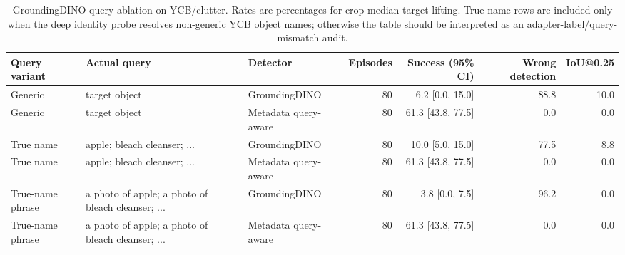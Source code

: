 \begin{table}[t]
\centering
\caption{GroundingDINO query-ablation on YCB/clutter. Rates are percentages for crop-median target lifting. True-name rows are included only when the deep identity probe resolves non-generic YCB object names; otherwise the table should be interpreted as an adapter-label/query-mismatch audit.}
\label{tab:scirep-query-ablation}
\scriptsize
\begin{tabular}{lllrrrr}
\toprule
Query variant & Actual query & Detector & Episodes & Success (95\% CI) & Wrong detection & IoU@0.25 \\
\midrule
Generic & target object & GroundingDINO & 80 & 6.2 [0.0, 15.0] & 88.8 & 10.0 \\
Generic & target object & Metadata query-aware & 80 & 61.3 [43.8, 77.5] & 0.0 & 0.0 \\
True name & apple; bleach cleanser; ... & GroundingDINO & 80 & 10.0 [5.0, 15.0] & 77.5 & 8.8 \\
True name & apple; bleach cleanser; ... & Metadata query-aware & 80 & 61.3 [43.8, 77.5] & 0.0 & 0.0 \\
True-name phrase & a photo of apple; a photo of bleach cleanser; ... & GroundingDINO & 80 & 3.8 [0.0, 7.5] & 96.2 & 0.0 \\
True-name phrase & a photo of apple; a photo of bleach cleanser; ... & Metadata query-aware & 80 & 61.3 [43.8, 77.5] & 0.0 & 0.0 \\
\bottomrule
\end{tabular}
\end{table}
